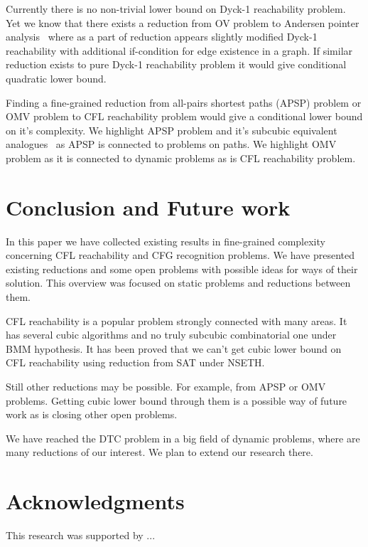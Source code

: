 \documentclass[acmsmall,review,nonacm]{acmart}\settopmatter{printfolios=true,printccs=false,printacmref=false}
\begin{document}
	 Currently there is no non-trivial lower bound on Dyck-1 reachability problem. 
	 Yet we know that there exists a reduction from OV problem to Andersen pointer analysis~\cite{10.1145/3434315} where as a part of reduction appears slightly modified Dyck-1 reachability with additional if-condition for edge existence in a graph. If similar reduction exists to pure Dyck-1 reachability problem it would give conditional quadratic lower bound. 
	 
	 Finding a fine-grained reduction from all-pairs shortest paths (APSP) problem or OMV problem to CFL reachability problem would give a conditional lower bound on it's complexity. We highlight APSP problem and it's subcubic equivalent analogues~\cite{10.1145/3186893} as APSP is connected to problems on paths. We highlight OMV problem as it is connected to dynamic problems as is CFL reachability problem. 
	
	\section{Conclusion and Future work}
	
	In this paper we have collected existing results in fine-grained complexity concerning CFL reachability and CFG recognition problems. We have presented existing reductions and some open problems with possible ideas for ways of their solution. This overview was focused on static problems and reductions between them.
	
	CFL reachability is a popular problem strongly connected with many areas. It has several cubic algorithms and no truly subcubic combinatorial one under BMM hypothesis. It has been proved that we can't get cubic lower bound on CFL reachability using reduction from SAT under NSETH. 
	
	Still other reductions may be possible. For example, from APSP or OMV problems. Getting cubic lower bound through them is a possible way of future work as is closing other open problems. 
	
	 We have reached the DTC problem in a big field of dynamic problems, where are many reductions of our interest. We plan to extend our research there. 
	
	\section{Acknowledgments}
	
	This research was supported by ...
	
	
	
	
	\appendix
	
\end{document}
